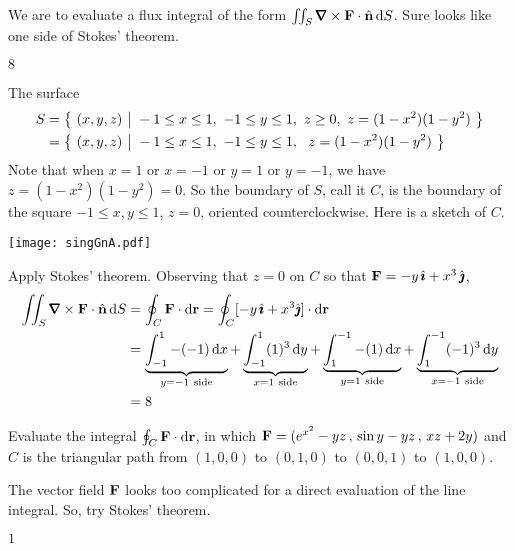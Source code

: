 \begin{hint} 
We are to evaluate a flux integral of the form $\dblInt_S\vnabla\times\vF\cdot\hn\,\dee{S}$. Sure looks like
one side of Stokes' theorem.
\end{hint}

\begin{answer} 
$8$
\end{answer}


\begin{solution}
The surface 
\begin{align*}
S&=\big\{ \ (x,y,z)\ \big|\ -1\le x\le 1,\ -1\le y\le 1,\ z\ge 0,\ z = (1-x^2)(1-y^2)\ \big\} \\
 &=\big\{ \ (x,y,z)\ \big|\ -1\le x\le 1,\ -1\le y\le 1,\ \ z = (1-x^2)(1-y^2)\ \big\}
\end{align*}
Note that when $x=1$ or $x=-1$ or $y=1$ or $y=-1$,
we have $z= (1-x^2)(1-y^2)=0$.  So the boundary of $S$,  call it $C$,
is the boundary of the square $-1\le x,y\le 1$, $z=0$, oriented 
counterclockwise. Here is a sketch of $C$.
\begin{center}
   \texttt{[image: singGnA.pdf]}
\end{center}
Apply Stokes' theorem. Observing that $z=0$ on $C$
so that $\mathbf{F} = -y\,\hat{\pmb{\imath}} +x^3\,\hat{\pmb{\jmath}}$,
\begin{align*}
\dblInt_S\vnabla\times\vF\cdot\hn\,\dee{S}
&=\oint_C\vF\cdot \dee{\vr}
=\oint_C[-y\,\hi+x^3\hj]\cdot \dee{\vr}\\
&=\underbrace{\int_{-1}^1 -(-1)\,\dee{x}}_{y=-1{\rm\ side}}
   +\underbrace{\int_{-1}^1 (1)^3\,\dee{y}}_{x=1{\rm\ side}}
   + \underbrace{\int^{-1}_1 -(1)\,\dee{x}}_{y=1{\rm\ side}}
   + \underbrace{\int^{-1}_1 (-1)^3\,\dee{y}}_{x=-1{\rm\ side}} \\
&=8
\end{align*}
\end{solution}


\begin{question}
Evaluate the integral   $\oint_C \mathbf{F}\cdot \mathrm{d}\mathbf{r}$, in which 
$\mathbf{F} = (e^{x^2} - yz\,,\,\sin y - yz \,,\,xz + 2y)$ and $C$
is the triangular path from $(1, 0, 0)$ to $(0, 1, 0)$ to $(0, 0, 1)$ to 
$(1, 0, 0)$. 
\end{question}

\begin{hint} 
The vector field $\mathbf{F}$ looks too complicated for a direct evaluation
of the line integral. So, try Stokes' theorem.
\end{hint}

\begin{answer} 
$1$
\end{answer}


